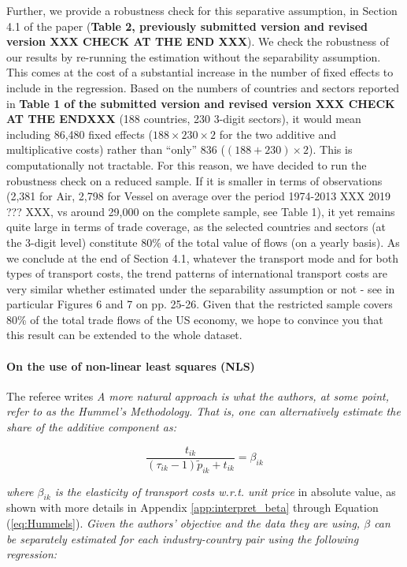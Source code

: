 \documentclass[a4paper,12pt]{article}
\begin{document}
Further, we provide a robustness check for this separative assumption, in Section 4.1 of the paper (\textbf{Table 2, previously submitted version and revised version XXX CHECK AT THE END XXX}). We check the robustness of our results by re-running the estimation without the separability assumption. This comes at the cost of a substantial increase in the number of fixed effects to include in the regression. Based on the numbers of countries and sectors reported in \textbf{Table 1 of the submitted version and revised version  XXX CHECK AT THE ENDXXX} (188 countries, 230 3-digit sectors), it would mean including 86,480 fixed effects ($188\times230\times2$ for the two additive and multiplicative costs) rather than ``only'' 836 ($(188+230)\times 2$). This is computationally not tractable. For this reason, we have decided to run the robustness check on a reduced sample. If it is smaller in terms of observations (2,381 for Air, 2,798 for Vessel on average over the period 1974-2013 XXX 2019 ??? XXX, vs around 29,000 on the complete sample, see Table 1), it yet remains quite large in terms of trade coverage, as the selected countries and sectors (at the 3-digit level) constitute 80\% of the total value of flows (on a yearly basis). As we conclude at the end of Section 4.1, whatever the transport mode and for both types of transport costs, the trend patterns of international transport costs are very similar whether estimated under the separability assumption or not - see in particular Figures 6 and 7 on pp. 25-26. Given that the restricted sample covers 80\% of the total trade flows of the US economy, we hope to convince you that this result can be extended to the whole dataset.


\paragraph{On the use of non-linear least squares (NLS)}

The referee writes \textit{A more natural approach is what the authors, at some point, refer to as the Hummel's Methodology. That is, one can alternatively estimate the share of the additive component as:}

$$\frac{t_{ik}}{ (\tau_{ik}-1)\tilde{p}_{ik} + t_{ik}} = \beta_{ik}$$

\textit{where $\beta_{ik}$ is the elasticity of transport costs w.r.t. unit price} in absolute value, as shown with more details in Appendix \ref{app:interpret_beta} through Equation (\ref{eq:Hummels}). \textit{Given the authors' objective and the data they are using, $\beta$ can be separately estimated
for each industry-country pair using the following regression:}
\end{document}
